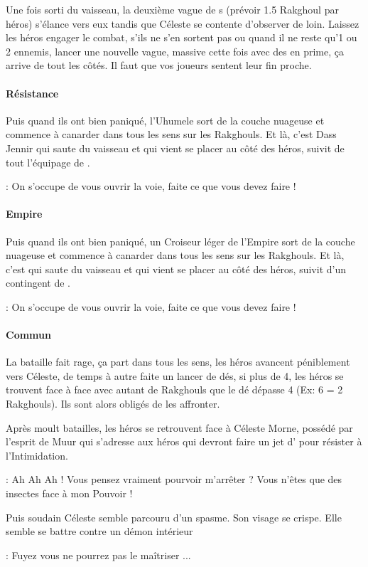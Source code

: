 Une fois sorti du vaisseau, la deuxième vague de s (prévoir 1.5 Rakghoul par héros) s’élance vers eux tandis que Céleste se contente d’observer de loin. Laissez les héros engager le combat, s’ils ne s’en sortent pas ou quand il ne reste qu’1 ou 2 ennemis, lancer une nouvelle vague, massive cette fois avec des  en prime, ça arrive de tout les côtés. Il faut que vos joueurs sentent leur fin proche. 

\paragraph{Résistance}
Puis quand ils ont bien paniqué, l’Uhumele sort de la couche nuageuse et commence à canarder dans tous les sens sur les Rakghouls. Et là, c’est Dass Jennir qui saute du vaisseau et qui vient se placer au côté des héros, suivit de tout l’équipage de . 
\begin{quotebox}
    : On s’occupe de vous ouvrir la voie, faite ce que vous devez faire !
\end{quotebox}

\paragraph{Empire}
Puis quand ils ont bien paniqué, un Croiseur léger de l’Empire sort de la couche nuageuse et commence à canarder dans tous les sens sur les Rakghouls. Et là, c’est  qui saute du vaisseau et qui vient se placer au côté des héros, suivit d’un contingent de . 
\begin{quotebox}
    : On s’occupe de vous ouvrir la voie, faite ce que vous devez faire !
\end{quotebox}

\paragraph{Commun}
La bataille fait rage, ça part dans tous les sens, les héros avancent péniblement vers Céleste, de temps à autre faite un lancer de dés, si plus de 4, les héros se trouvent face à face avec autant de Rakghouls que le dé dépasse 4 (Ex: 6 = 2 Rakghouls). Ils sont alors obligés de les affronter.

Après moult batailles, les héros se retrouvent face à Céleste Morne, possédé par l’esprit de Muur qui s’adresse aux héros qui devront faire un jet d’ pour résister à l’Intimidation. 
\begin{quotebox}
    : Ah Ah Ah ! Vous pensez vraiment pourvoir m’arrêter ? Vous n’êtes que des insectes face à mon Pouvoir !
\end{quotebox}
    Puis soudain Céleste semble parcouru d’un spasme. Son visage se crispe. Elle semble se battre contre un démon intérieur \ldot
\begin{quotebox}
    : Fuyez vous ne pourrez pas le maîtriser ... 
\end{quotebox}

